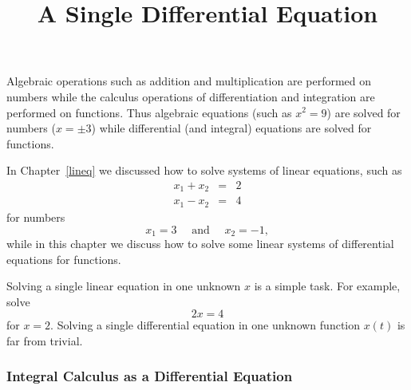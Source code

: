 \documentclass{ximera}
\title{A Single Differential Equation}
\begin{document}
\begin{abstract}
\end{abstract}
\maketitle

  \label{S:singlelineareqn}

Algebraic operations such as addition and multiplication are
performed on numbers while the calculus operations of
differentiation and integration are performed on functions.
Thus algebraic equations (such as $x^2=9$) are solved for
numbers ($x=\pm 3$) while differential (and integral) equations
are solved for functions.

In Chapter~\ref{lineq} we discussed how to solve systems of
linear equations, such as
\begin{eqnarray*}
x_1 + x_2 & = & 2 \\
x_1 - x_2 & = & 4
\end{eqnarray*}
for numbers
\[
x_1=3 \quad \mbox{ and } \quad x_2=-1,
\]
while in this chapter we discuss how to solve some linear systems of
differential equations for functions.

Solving a single linear equation in one unknown $x$ is a simple
task.  For example, solve
\[
2x = 4
\]
for $x=2$.  Solving a single differential equation in one unknown function
$x(t)$ is far from trivial.

\subsubsection*{Integral Calculus as a Differential Equation}
\end{document}
